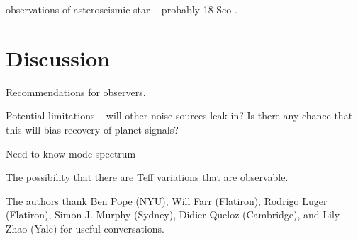 \documentclass[modern]{aastex62}
\begin{document}
\HARPS observations of asteroseismic star -- probably 18 Sco \citep{Bazot2012}.

\section{Discussion}

Recommendations for observers.

Potential limitations -- will other noise sources leak in? Is there any chance that this will bias recovery of planet signals?

Need to know mode spectrum

The possibility that there are Teff variations that are observable.

\acknowledgements

The authors thank
  Ben Pope (NYU),
  Will Farr (Flatiron),
  Rodrigo Luger (Flatiron),
  Simon J. Murphy (Sydney),
  Didier Queloz (Cambridge), and
  Lily Zhao (Yale)
for useful conversations.



\clearpage


\end{document}
